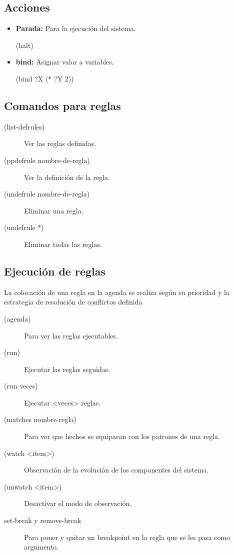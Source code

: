 \documentclass[12pt, twoside, openright]{report} %
\begin{document}
\subsection{Acciones}
\begin{itemize}
	\item \textbf{Parada:} Para la ejecución del sistema.
	      
	      (halt)
	\item \textbf{bind:} Asignar valor a variables.
	      
	      (bind ?X (* ?Y 2))
\end{itemize}

\subsection{Comandos para reglas}
\begin{description}
	\item[(list-defrules)] Ver las reglas definidas.
	\item[(ppdefrule nombre-de-regla)] Ver la definición de la regla.
	\item[(undefrule nombre-de-regla)] Eliminar una regla.
	\item[(undefrule *)] Eliminar todas las reglas.
\end{description}

\subsection{Ejecución de reglas}
La colocación de una regla en la agenda se realiza según su prioridad y la estrategia de resolución de conflictos definida

\begin{description}
	\item[(agenda)] Para ver las reglas ejecutables.
	\item[(run)] Ejecutar las reglas seguidas.
	\item[(run veces)] Ejecutar <veces> reglas.
	\item[(matches nombre-regla)] Para ver que hechos se equiparan con los patrones de una regla.
	\item[(watch <item>)] Observación de la evolución de los componentes del sistema.
	\item[(unwatch <item>)] Desactivar el modo de observación.
	\item[set-break y remove-break] Para poner y quitar un breakpoint en la regla
	      que se les pasa como argumento.
\end{description}
\end{document}
